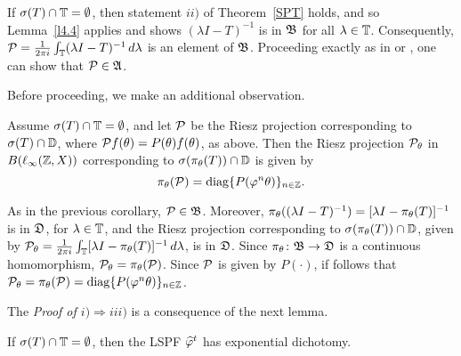 \begin{pf}  If $\sigma(T)\cap{\Bbb{T}} =\emptyset$, then statement $ii)$
of Theorem~\ref{SPT} holds, and so Lemma~\ref{l4.4} applies
and shows $(\lambda I -T)^{-1}$ is in ${\frak{B}}$ for all
$\lambda\in{\Bbb{T}}$.  Consequently,
${\cal{P}}=\frac{1}{2\pi i}\int_{{\Bbb{T}}}(\lambda I-T)^{-1}\,d\lambda$ is
an element of ${\frak{B}}$.  Proceeding exactly as in
\cite{LS} or \cite[Lemma 3]{LATGDDE}, one can show that ${\cal{P}} \in
{\frak{A}}$. \end{pf}

Before proceeding, we make an additional observation.

\begin{prop} Assume
$\sigma(T)\cap{\Bbb{T}} = \emptyset$, and let
${\cal{P}}$ be the Riesz
projection corresponding to $\sigma(T)\cap{\Bbb{D}}$, where ${\cal{P}}
f(\theta)=P(\theta)f(\theta)$, as above.
Then the Riesz projection ${\cal{P}}_\theta$ in $B(\ell_\infty({\Bbb{Z}},X))$
corresponding to $\sigma(\pi_\theta(T))\cap{\Bbb{D}}$ is
given by \[\pi_\theta({\cal{P}})=\operatorname{diag}\{P(\varphi^n\theta)\}_{n\in{\Bbb{Z}}}.\]
\end{prop}

\begin{pf}  As in the previous corollary, ${\cal{P}}\in{\frak{B}}$.
Moreover,
$\pi_\theta((\lambda I-T)^{-1})=[\lambda I-\pi_\theta(T)]^{-1}$ is in
${\frak{D}}$, for $\lambda\in{\Bbb{T}}$, and the Riesz projection
corresponding to $\sigma(\pi_\theta(T))\cap{\Bbb{D}}$, given by
${\cal{P}}_\theta=\frac{1}{2\pi i} \int_{{\Bbb{T}}}[\lambda
I-\pi_\theta(T)]^{-1}\,d\lambda$, is in ${\frak{D}}$. Since  $\pi_\theta\colon
{\frak{B}}\to{\frak{D}}$ is a continuous homomorphism,
${\cal{P}}_\theta=\pi_\theta({\cal{P}})$.  Since ${\cal{P}}$ is given by $P(\cdot)$, if
follows that
${\cal{P}}_\theta=\pi_\theta({\cal{P}})=\operatorname{diag}\{P(\varphi^n\theta)\}_{n\in{\Bbb{Z}}}$.
\end{pf}


The {\em Proof of $i)\Rightarrow iii)$} is a consequence of
the next lemma.

\begin{lem}  If $\sigma(T)\cap{\Bbb{T}} = \emptyset$, then
the LSPF $\widehat{\varphi}^t$ has exponential dichotomy.
\end{lem}

